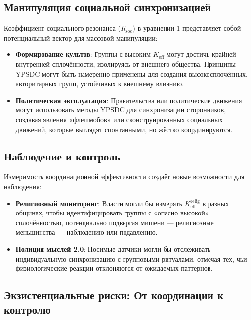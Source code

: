 \documentclass[12pt,a4paper]{article}
\begin{document}
	\subsection{Манипуляция социальной синхронизацией}
	
	Коэффициент социального резонанса ($R_{\mathrm{soc}}$) в уравнении 1 представляет собой потенциальный вектор для массовой манипуляции:
	
	\begin{itemize}
		\item \textbf{Формирование культов}: Группы с высоким $K_{\mathrm{eff}}$ могут достичь крайней внутренней сплочённости, изолируясь от внешнего общества. Принципы YPSDC могут быть намеренно применены для создания высокосплочённых, авторитарных групп, устойчивых к внешнему влиянию.
		
		\item \textbf{Политическая эксплуатация}: Правительства или политические движения могут использовать методы YPSDC для синхронизации сторонников, создавая явления «флешмобов» или сконструированных социальных движений, которые выглядят спонтанными, но жёстко координируются.
	\end{itemize}
	
	\subsection{Наблюдение и контроль}
	
	Измеримость координационной эффективности создаёт новые возможности для наблюдения:
	
	\begin{itemize}
		\item \textbf{Религиозный мониторинг}: Власти могли бы измерять $K_{\mathrm{eff}}^{\mathrm{relig}}$ в разных общинах, чтобы идентифицировать группы с «опасно высокой» сплочённостью, потенциально подвергая мишени — религиозные меньшинства — наблюдению или подавлению.
		
		\item \textbf{Полиция мыслей 2.0}: Носимые датчики могли бы отслеживать индивидуальную синхронизацию с групповыми ритуалами, отмечая тех, чьи физиологические реакции отклоняются от ожидаемых паттернов.
	\end{itemize}
	
	\subsection{Экзистенциальные риски: От координации к контролю}
	
\end{document}
